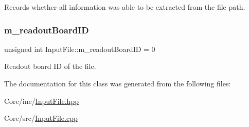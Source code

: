 Records whether all information was able to be extracted from the file path. 

\mbox{\label{class_input_file_a15431dd487c5ac563745856544c9261d}} 
\subsubsection{\texorpdfstring{m\+\_\+readout\+Board\+ID}{m\_readoutBoardID}}
{\footnotesize\ttfamily unsigned int Input\+File\+::m\+\_\+readout\+Board\+ID = 0\hspace{0.3cm}{\ttfamily [private]}}



Readout board ID of the file. 



The documentation for this class was generated from the following files\+:\begin{DoxyCompactItemize}
\item 
Core/inc/\hyperlink{_input_file_8hpp}{Input\+File.\+hpp}\item 
Core/src/\hyperlink{_input_file_8cpp}{Input\+File.\+cpp}\end{DoxyCompactItemize}
